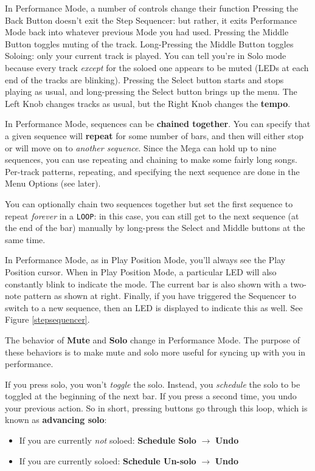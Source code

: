 \documentclass{article}
\begin{document}
In Performance Mode, a number of controls change their function  Pressing the Back Button doesn't exit the Step Sequencer: but rather, it exits Performance Mode back into whatever previous Mode you had used.  Pressing the Middle Button toggles muting of  the track.  Long-Pressing the Middle Button toggles Soloing: only your current track is played.  You can tell you're in Solo mode because every track {\it except} for the soloed one appears to be muted (LEDs at each end of the tracks are blinking).  Pressing the Select button starts and stops playing as usual, and long-pressing the Select button brings up the menu.  The Left Knob changes tracks as usual, but the Right Knob changes the {\bf tempo}.

In Performance Mode, sequences can be {\bf chained together}.  You can specify that a given sequence will {\bf repeat} for some number of bars, and then will either stop or will move on to {\it another sequence}.  Since the Mega can hold up to nine sequences, you can use repeating and chaining to make some fairly long songs.  Per-track patterns, repeating, and specifying the next sequence are done in the Menu Options (see later).

You can optionally chain two sequences together but set the first sequence to repeat {\it forever} in a {\tt LOOP}: in this case, you can still get to the next sequence (at the end of the bar) manually by long-press the Select and Middle buttons at the same time.

In Performance Mode, as in Play Position Mode, you'll always see the Play Position cursor.  When in Play Position Mode, a particular LED will also constantly blink to indicate the mode.  The current bar is also shown with a two-note pattern as shown at right.  Finally, if you have triggered the Sequencer to switch to a new sequence, then an LED is displayed to indicate this as well. See Figure \ref{stepsequencer}.

The behavior of {\bf Mute} and {\bf Solo} change in Performance Mode. The purpose of these behaviors is to make mute and solo more useful for syncing up with you in performance.

If you press solo, you won't {\it toggle} the solo.  Instead, you {\it schedule} the solo to be toggled at the beginning of the next bar.  If you press a second time, you undo your previous action.  So in short, pressing buttons go through this loop, which is known as {\bf advancing solo}:

\begin{itemize}
\item If you are currently {\it not} soloed: {\bf Schedule Solo} \(\rightarrow\) {\bf Undo}
\item If you are currently soloed: {\bf Schedule Un-solo} \(\rightarrow\) {\bf Undo}
\end{itemize}
\end{document}
